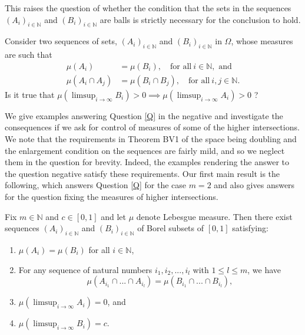 \documentclass[12pt]{article}
\begin{document}
    
    This raises the question of whether the condition that the sets in the sequences $(A_i)_{i \in \mathbb{N}}$ and $(B_i)_{i \in \mathbb{N}}$ are balls is strictly necessary for the conclusion to hold.

\begin{question} \label{Q}
Consider two sequences of sets, $(A_i)_{i \in \mathbb{N}}$ and $(B_i)_{i \in \mathbb{N}}$ in $\Omega$, whose measures are such that
\begin{equation}
\label{the very first intersection requirement}
\begin{split}
    \mu (A_i) &= \mu (B_i),  \quad  \text{for all}~ i \in \mathbb{N}, \text{ and} \\
     \mu (A_i \cap A_j) &= \mu (B_i \cap B_j),  \quad \text{for all} ~ i, j \in \mathbb{N}.
    \end{split}
\end{equation}
Is it true that $\mu(\limsup_{i\rightarrow \infty} B_i)>0  \implies  \mu(\limsup_{i \rightarrow \infty} A_i)>0$ ?
\end{question}


We give examples answering Question \ref{Q} in the negative and investigate the consequences if we ask for control of measures of some of the higher intersections. We note that the requirements in Theorem BV1 of the space being doubling and the enlargement condition on the sequences are fairly mild, and so we neglect them in the question for brevity. Indeed, the examples rendering the answer to the question negative satisfy these requirements. Our first main result is the following, which answers Question \ref{Q} for the case $m=2$ and also gives answers for the question fixing the measures of higher intersections.


\begin{theorem} \label{the equality theorem}
    Fix $m\in \mathbb{N}$ and $c \in [0,1]$ and let $\mu$ denote Lebesgue measure. Then there exist sequences $(A_i)_{i \in \mathbb{N}}$ and $(B_i)_{i \in \mathbb{N}}$ of Borel subsets of $[0,1]$ satisfying:
\begin{enumerate}[label=(\roman*)]
    \item $\mu (A_i)  = \mu (B_i)$  for all $i \in \mathbb{N}$, 
     \item For any sequence of natural numbers $i_1,i_2,...,i_l$ with $1 \leq l \leq m$, we have 
     \[\mu(A_{i_1} \cap ... \cap A_{i_l})  = \mu(B_{i_1} \cap ... \cap B_{i_l}),\]
     \item $\mu(\limsup_{i \rightarrow \infty} A_i) =0$, and
     \item $\mu(\limsup_{i \rightarrow \infty} B_i) =c$.
    \end{enumerate}

\end{theorem}
\end{document}
